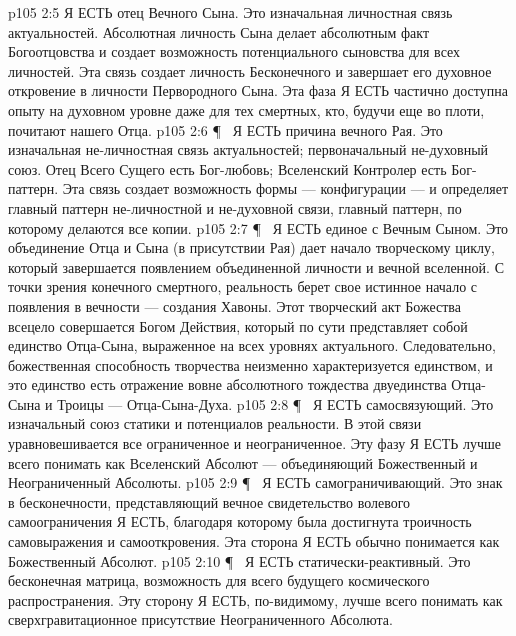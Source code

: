 \vs p105 2:5 \bibnobreakspace {} Я ЕСТЬ отец Вечного Сына. Это изначальная личностная связь актуальностей. Абсолютная личность Сына делает абсолютным факт Богоотцовства и создает возможность потенциального сыновства для всех личностей. Эта связь создает личность Бесконечного и завершает его духовное откровение в личности Первородного Сына. Эта фаза Я ЕСТЬ частично доступна опыту на духовном уровне даже для тех смертных, кто, будучи еще во плоти, почитают нашего Отца.
\vs p105 2:6 \P\ \bibnobreakspace {} Я ЕСТЬ причина вечного Рая. Это изначальная не\hyp{}личностная связь актуальностей; первоначальный не\hyp{}духовный союз. Отец Всего Сущего есть Бог\hyp{}любовь; Вселенский Контролер есть Бог\hyp{}паттерн. Эта связь создает возможность формы --- конфигурации --- и определяет главный паттерн не\hyp{}личностной и не\hyp{}духовной связи, главный паттерн, по которому делаются все копии.
\vs p105 2:7 \P\ \bibnobreakspace {} Я ЕСТЬ единое с Вечным Сыном. Это объединение Отца и Сына (в присутствии Рая) дает начало творческому циклу, который завершается появлением объединенной личности и вечной вселенной. С точки зрения конечного смертного, реальность берет свое истинное начало с появления в вечности --- создания Хавоны. Этот творческий акт Божества всецело совершается Богом Действия, который по сути представляет собой единство Отца\hyp{}Сына, выраженное на всех уровнях актуального. Следовательно, божественная способность творчества неизменно характеризуется единством, и это единство есть отражение вовне абсолютного тождества двуединства Отца\hyp{}Сына и Троицы --- Отца\hyp{}Сына\hyp{}Духа.
\vs p105 2:8 \P\ \bibnobreakspace {} Я ЕСТЬ самосвязующий. Это изначальный союз статики и потенциалов реальности. В этой связи уравновешивается все ограниченное и неограниченное. Эту фазу Я ЕСТЬ лучше всего понимать как Вселенский Абсолют --- объединяющий Божественный и Неограниченный Абсолюты.
\vs p105 2:9 \P\ \bibnobreakspace {} Я ЕСТЬ самограничивающий. Это знак в бесконечности, представляющий вечное свидетельство волевого самоограничения Я ЕСТЬ, благодаря которому была достигнута троичность самовыражения и самооткровения. Эта сторона Я ЕСТЬ обычно понимается как Божественный Абсолют.
\vs p105 2:10 \P\ \bibnobreakspace {} Я ЕСТЬ статически\hyp{}реактивный. Это бесконечная матрица, возможность для всего будущего космического распространения. Эту сторону Я ЕСТЬ, по\hyp{}видимому, лучше всего понимать как сверхгравитационное присутствие Неограниченного Абсолюта.
